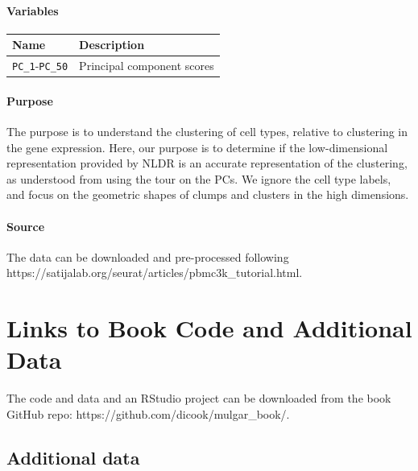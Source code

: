 \documentclass[
  letterpaper,
]{krantz}
\newcounter{none} %
\begin{document}
\subsubsection*{Variables}\label{variables-16}

{\def\LTcaptype{none} %
\begin{longtable}[]{@{}ll@{}}
\toprule\noalign{}
Name & Description \\
\midrule\noalign{}
\endhead
\bottomrule\noalign{}
\endlastfoot
\texttt{PC\_1}-\texttt{PC\_50} & Principal component scores \\
\end{longtable}
}

\subsubsection*{Purpose}\label{purpose-16}

The purpose is to understand the clustering of cell types, relative to
clustering in the gene expression. Here, our purpose is to determine if
the low-dimensional representation provided by NLDR is an accurate
representation of the clustering, as understood from using the tour on
the PCs. We ignore the cell type labels, and focus on the geometric
shapes of clumps and clusters in the high dimensions.

\subsubsection*{Source}\label{source-16}

The data can be downloaded and pre-processed following
https://satijalab.org/seurat/articles/pbmc3k\_tutorial.html.

\chapter{Links to Book Code and Additional Data}\label{book-data}

The code and data and an RStudio project can be downloaded from the book
GitHub repo: https://github.com/dicook/mulgar\_book/.

\section{Additional data}\label{additional-data}
\end{document}
